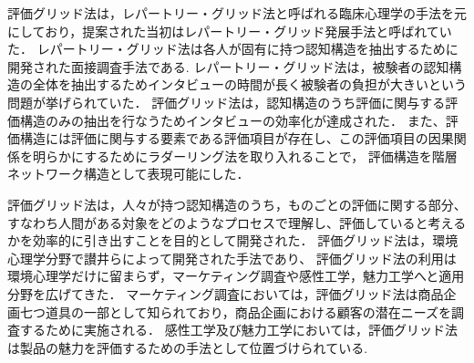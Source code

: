 \documentclass[syuuron]{kuee}
\begin{document}
		評価グリッド法は，レパートリー・グリッド法\cite{rg1}と呼ばれる臨床心理学の手法を元にしており，提案された当初はレパートリー・グリッド発展手法と呼ばれていた．
		レパートリー・グリッド法は各人が固有に持つ認知構造を抽出するために開発された面接調査手法である. 
		レパートリー・グリッド法は，被験者の認知構造の全体を抽出するためインタビューの時間が長く被験者の負担が大きいという問題が挙げられていた．
		評価グリッド法は，認知構造のうち評価に関与する評価構造のみの抽出を行なうためインタビューの効率化が達成された．
		また、評価構造には評価に関与する要素である評価項目が存在し、この評価項目の因果関係を明らかにするためにラダーリング法を取り入れることで，
		評価構造を階層ネットワーク構造として表現可能にした．
		
		評価グリッド法は，人々が持つ認知構造のうち，ものごとの評価に関する部分、
		すなわち人間がある対象をどのようなプロセスで理解し、評価していると考えるかを効率的に引き出すことを目的として開発された．
		評価グリッド法は，環境心理学分野で讃井らによって開発された手法であり、
		評価グリッド法の利用は環境心理学だけに留まらず，マーケティング調査や感性工学，魅力工学へと適用分野を広げてきた．
		マーケティング調査においては，評価グリッド法は商品企画七つ道具の一部として知られており，商品企画における顧客の潜在ニーズを調査するために実施される．
		感性工学及び魅力工学においては，評価グリッド法は製品の魅力を評価するための手法として位置づけられている. 
		
\end{document}
